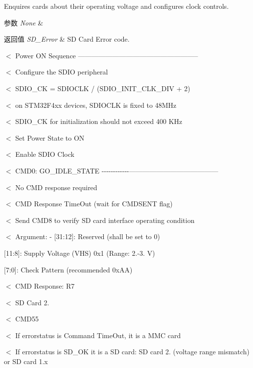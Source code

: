 Enquires cards about their operating voltage and configures clock controls. 


\begin{DoxyParams}{参数}
{\em None} & \\
\hline
\end{DoxyParams}

\begin{DoxyRetVals}{返回值}
{\em S\+D\+\_\+\+Error} & SD Card Error code. \\
\hline
\end{DoxyRetVals}
$<$ Power ON Sequence -----------------------------------------------------

$<$ Configure the S\+D\+IO peripheral

$<$ S\+D\+I\+O\+\_\+\+CK = S\+D\+I\+O\+C\+LK / (S\+D\+I\+O\+\_\+\+I\+N\+I\+T\+\_\+\+C\+L\+K\+\_\+\+D\+IV + 2)

$<$ on S\+T\+M32\+F4xx devices, S\+D\+I\+O\+C\+LK is fixed to 48\+M\+Hz

$<$ S\+D\+I\+O\+\_\+\+CK for initialization should not exceed 400 K\+Hz

$<$ Set Power State to ON

$<$ Enable S\+D\+IO Clock

$<$ C\+M\+D0\+: G\+O\+\_\+\+I\+D\+L\+E\+\_\+\+S\+T\+A\+TE -\/-\/-\/-\/-\/-\/-\/-\/-\/-\/-\/-\/---------------------------------------

$<$ No C\+MD response required

$<$ C\+MD Response Time\+Out (wait for C\+M\+D\+S\+E\+NT flag)

$<$ Send C\+M\+D8 to verify SD card interface operating condition

$<$ Argument\+: -\/ \mbox{[}31\+:12\mbox{]}\+: Reserved (shall be set to \textquotesingle{}0\textquotesingle{})
\begin{DoxyItemize}
\item \mbox{[}11\+:8\mbox{]}\+: Supply Voltage (V\+HS) 0x1 (Range\+: 2.-\/3. V)
\item \mbox{[}7\+:0\mbox{]}\+: Check Pattern (recommended 0x\+AA)
\end{DoxyItemize}

$<$ C\+MD Response\+: R7

$<$ SD Card 2.

$<$ C\+M\+D55

$<$ If errorstatus is Command Time\+Out, it is a M\+MC card

$<$ If errorstatus is S\+D\+\_\+\+OK it is a SD card\+: SD card 2. (voltage range mismatch) or SD card 1.\+x

